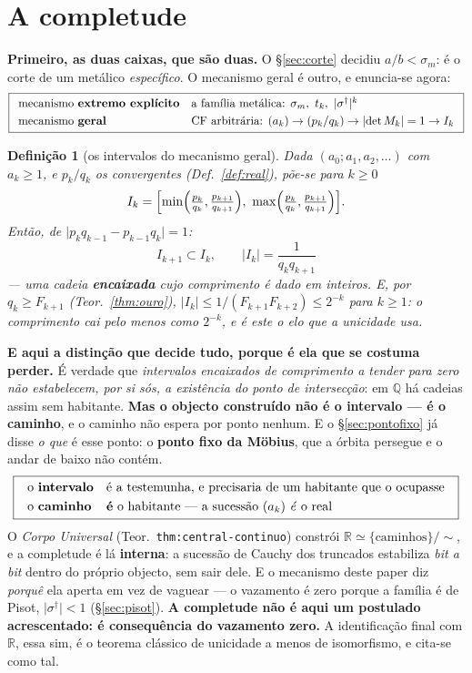 \documentclass[11pt,a4paper]{article}
\newtheorem{definicao}{Definição}
\newcommand{\code}[1]{\texttt{\small #1}}
\newcommand{\abs}[1]{\lvert #1\rvert}
\newcommand{\dg}{^{\dagger}}
\begin{document}
\section{A completude}\label{sec:completude}

\noindent\textbf{Primeiro, as duas caixas, que são duas.} O \S\ref{sec:corte}
decidiu $a/b<\sigma_m$: é o corte de um metálico \emph{específico}. O mecanismo
geral é outro, e enuncia-se agora:
\[
\boxed{
\begin{array}{ll}
\text{mecanismo \textbf{extremo explícito}} &
\text{a família metálica: } \sigma_m,\ t_k,\ \abs{\sigma\dg}^{k}\\[3pt]
\text{mecanismo \textbf{geral}} &
\text{CF arbitrária: } (a_k)\to(p_k/q_k)\to\abs{\det M_k}=1\to I_k
\end{array}}
\]

\begin{definicao}[os intervalos do mecanismo geral]\label{def:Ik}
Dada $(a_0;a_1,a_2,\ldots)$ com $a_k\geq1$, e $p_k/q_k$ os convergentes
(Def.~\ref{def:real}), põe-se para $k\geq0$
\[
I_k=\Bigl[\min\Bigl(\tfrac{p_k}{q_k},\tfrac{p_{k+1}}{q_{k+1}}\Bigr),\
\max\Bigl(\tfrac{p_k}{q_k},\tfrac{p_{k+1}}{q_{k+1}}\Bigr)\Bigr].
\]
Então, de $\abs{p_kq_{k-1}-p_{k-1}q_k}=1$:
\[
\boxed{\;I_{k+1}\subset I_k,\qquad \abs{I_k}=\frac{1}{q_kq_{k+1}}\;}
\]
--- uma cadeia \textbf{encaixada} cujo comprimento é dado em inteiros. E, por
$q_k\geq F_{k+1}$ (Teor.~\ref{thm:ouro}),
$\abs{I_k}\leq 1/(F_{k+1}F_{k+2})\leq2^{-k}$ para $k\geq1$: \emph{o comprimento
cai pelo menos como $2^{-k}$}, e é este o elo que a unicidade usa.
\end{definicao}

\medskip
\noindent\textbf{E aqui a distinção que decide tudo, porque é ela que se costuma
perder.} É verdade que \emph{intervalos encaixados de comprimento a tender para
zero não estabelecem, por si sós, a existência do ponto de intersecção}: em
$\mathbb{Q}$ há cadeias assim sem habitante. \textbf{Mas o objecto construído não é
o intervalo --- é o caminho}, e o caminho não espera por ponto nenhum. E o
\S\ref{sec:pontofixo} já disse \emph{o que} é esse ponto: o \textbf{ponto fixo da
Möbius}, que a órbita persegue e o andar de baixo não contém.
\[
\boxed{\;\begin{array}{ll}
\text{o \textbf{intervalo}} & \text{é a testemunha, e precisaria de um habitante que
o ocupasse}\\[3pt]
\text{o \textbf{caminho}} & \textbf{é} \text{ o habitante --- a sucessão } (a_k)
\text{ \emph{é} o real}
\end{array}\;}
\]
O \emph{Corpo Universal} (Teor.~\code{thm:central-continuo}) constrói
$\mathbb{R}\simeq\{\text{caminhos}\}/\!\sim$, e a completude é lá \textbf{interna}: a
sucessão de Cauchy dos truncados estabiliza \emph{bit a bit} dentro do próprio
objecto, sem sair dele. E o mecanismo deste paper diz \emph{porquê} ela aperta em
vez de vaguear --- o vazamento é zero porque a família é de Pisot,
$\abs{\sigma\dg}<1$ (\S\ref{sec:pisot}). \textbf{A completude não é aqui um
postulado acrescentado: é consequência do vazamento zero.} A identificação final
com $\mathbb{R}$, essa sim, é o teorema clássico de unicidade a menos de
isomorfismo, e cita-se como tal.
\end{document}

